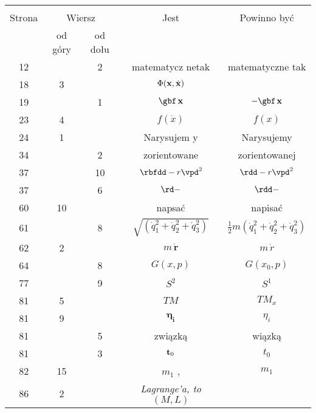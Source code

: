 \documentclass[a4paper,11pt]{article}
\begin{document}
\begin{center}

  \begin{tabular}{|c|c|c|c|c|}
    \hline
    & \multicolumn{2}{c|}{} & & \\
    Strona & \multicolumn{2}{c|}{Wiersz} & Jest
                              & Powinno być \\ \cline{2-3}
    & od góry & od dołu & & \\
    \hline
    12  & &  2 & matematycz netak & matematyczne tak \\
    18  &  3 & & $\Phi( \mathbf{x}, \dot{ \mathbf{x} } )$
           & %
    \\
    19  & &  1 & $\gbf\, \vecxbold$ & $- \gbf\, \vecxbold$ \\
    23  &  4 & & $f( \dot{ x } )$ & $f( x )$ \\
    24  &  1 & & Narysujem y & Narysujemy \\
    34  & &  2 & zorientowane & zorientowanej \\
    37  & & 10 & $\rbfdd - r \vpd^{ 2 }$ & $\rdd - r \vpd^{ 2 }$ \\
    37  & &  6 & $\rd -$ & $\rdd -$ \\
    60  & 10 & & napsać & napisać \\
    61  & &  8 & $\sqrt{ ( \dot{ q }_{ 1 }^{ 2 } + \dot{ q }_{ 2 }^{ 2 }
                 + \dot{ q }_{ 3 }^{ 2 } ) }$
           & $\frac{ 1 }{ 2 } m ( \dot{ q }_{ 1 }^{ 2 } + \dot{ q }_{ 2 }^{ 2 }
             + \dot{ q }_{ 3 }^{ 2 } )$ \\
    62  &  2 & & $m\, \dot{ \mathbf{r} }$ & $m\, \dot{ r }$ \\
    64  & &  8 & $G( x, p )$ & $G( x_{ 0 }, p )$ \\
    77  & &  9 & $S^{ 2 }$ & $S^{ 1 }$ \\
    81  &  5 & & $TM$ & $TM_{ x }$ \\
    81  &  9 & & $\mathbf{ \eta_{ i } }$ & $\eta_{ i }$ \\
    81  & &  5 & związką & wiązką \\
    81  & &  3 & $\mathbf{t}_{ 0 }$ & $t_{ 0 }$ \\
    82  & 15 & & $m_{ 1 }${  }, & $m_{ 1 }$ \\
    86  &  2 & & \textit{Lagrange'a, to $( M, L )$}

\end{tabular}
\end{center}
\end{document}
